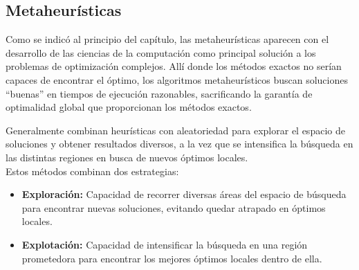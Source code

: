 \documentclass[12pt,a4paper]{book}
\begin{document}
\subsection{Metaheurísticas}
Como se indicó al principio del capítulo, las metaheurísticas \cite{metaheuristicos} aparecen con el desarrollo de las ciencias de la computación como principal solución a los problemas de optimización complejos. Allí donde los métodos exactos no serían capaces de encontrar el óptimo,
los algoritmos metaheurísticos buscan soluciones ``buenas'' en tiempos de ejecución razonables, sacrificando la garantía de optimalidad global que proporcionan los métodos exactos.

Generalmente combinan heurísticas con aleatoriedad para explorar el espacio de soluciones y obtener resultados diversos, a la vez que se intensifica la búsqueda en las distintas regiones en busca de nuevos óptimos locales.\\
Estos métodos combinan dos estrategias:
\begin{itemize}
    \item \textbf{Exploración:} Capacidad de recorrer diversas áreas del espacio de búsqueda para encontrar nuevas soluciones, evitando quedar atrapado en óptimos locales.
    \item \textbf{Explotación:} Capacidad de intensificar la búsqueda en una región prometedora para encontrar los mejores óptimos locales dentro de ella.
\end{itemize}
\end{document}

